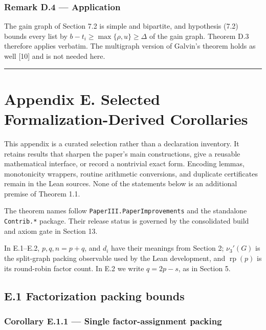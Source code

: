 \documentclass[
  american,
  11pt,
  a4paper,
]{article}
\begin{document}
\subsubsection{Remark D.4 --- Application}\label{remark-d.4-application}

The gain graph of Section 7.2 is simple and bipartite, and hypothesis (7.2) bounds every list by \(b-t_i\ge\max\{\rho,u\}\ge\Delta\) of the gain graph. Theorem D.3 therefore applies verbatim. The multigraph version of Galvin's theorem holds as well {[}10{]} and is not needed here.

\begin{center}\rule{0.5\linewidth}{0.5pt}\end{center}

\section{Appendix E. Selected Formalization-Derived Corollaries}\label{appendix-e.-selected-formalization-derived-corollaries}

This appendix is a curated selection rather than a declaration inventory. It retains results that sharpen the paper's main constructions, give a reusable mathematical interface, or record a nontrivial exact form. Encoding lemmas, monotonicity wrappers, routine arithmetic conversions, and duplicate certificates remain in the Lean sources. None of the statements below is an additional premise of Theorem 1.1.

The theorem names follow \texttt{PaperIII.PaperImprovements} and the standalone \texttt{Contrib.*} package. Their release status is governed by the consolidated build and axiom gate in Section 13.

In E.1--E.2, \(p,q,n=p+q\), and \(d_i\) have their meanings from Section 2; \(\nu_3'(G)\) is the split-graph packing observable used by the Lean development, and \(\operatorname{rp}(p)\) is its round-robin factor count. In E.2 we write \(q=2p-s\), as in Section 5.

\subsection{E.1 Factorization packing bounds}\label{e.1-factorization-packing-bounds}

\subsubsection{Corollary E.1.1 --- Single factor-assignment packing}\label{corollary-e.1.1-single-factor-assignment-packing}
\end{document}
